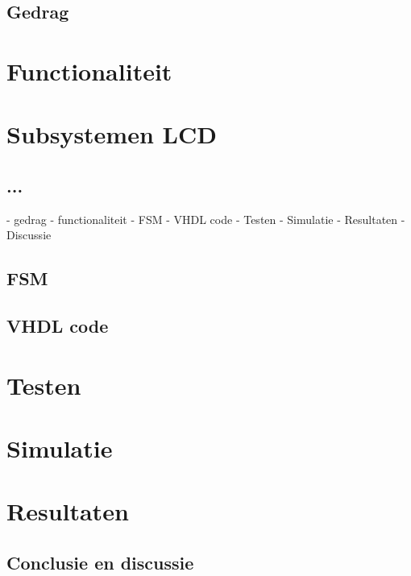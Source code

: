 \subsection{Gedrag}

\section{Functionaliteit}


\section{Subsystemen LCD}
\subsection{...}


- gedrag
- functionaliteit
- FSM
- VHDL code 
- Testen 
- Simulatie
- Resultaten
- Discussie

	

\subsection{FSM}


\subsection{VHDL code}

\section{Testen}

\section{Simulatie}

\section{Resultaten}

\subsection{Conclusie en discussie}

